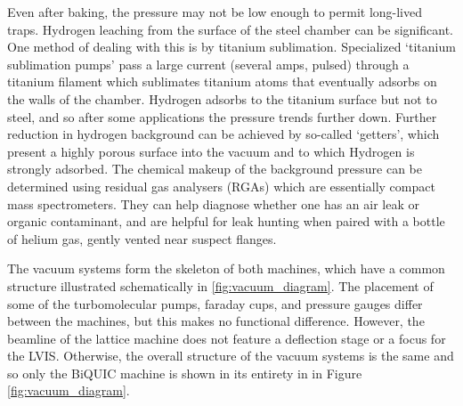 	Even after baking, the pressure may not be low enough to permit long-lived traps. Hydrogen leaching from the surface of the steel chamber can be significant. One method of dealing with this is by titanium sublimation. Specialized `titanium sublimation pumps' pass a large current (several amps, pulsed) through a titanium filament which sublimates titanium atoms that eventually adsorbs on the walls of the chamber. Hydrogen adsorbs to the titanium surface but not to steel, and so after some applications the pressure trends further down. Further reduction in hydrogen background can be achieved by so-called `getters', which present a highly porous surface into the vacuum and to which Hydrogen is strongly adsorbed. The chemical makeup of the background pressure can be determined using residual gas analysers (RGAs) which are essentially compact mass spectrometers. They can help diagnose whether one has an air leak or organic contaminant, and are helpful for leak hunting when paired with a bottle of helium gas, gently vented near suspect flanges.

	The vacuum systems form the skeleton of both machines, which have a common structure illustrated schematically in \ref{fig:vacuum_diagram}. The placement of some of the turbomolecular pumps, faraday cups, and pressure gauges differ between the machines, but this makes no functional difference. However, the beamline of the lattice machine does not feature a deflection stage or a focus for the LVIS. Otherwise, the overall structure of the vacuum systems is the same and so only the BiQUIC machine is shown in its entirety in in Figure \ref{fig:vacuum_diagram}. 

